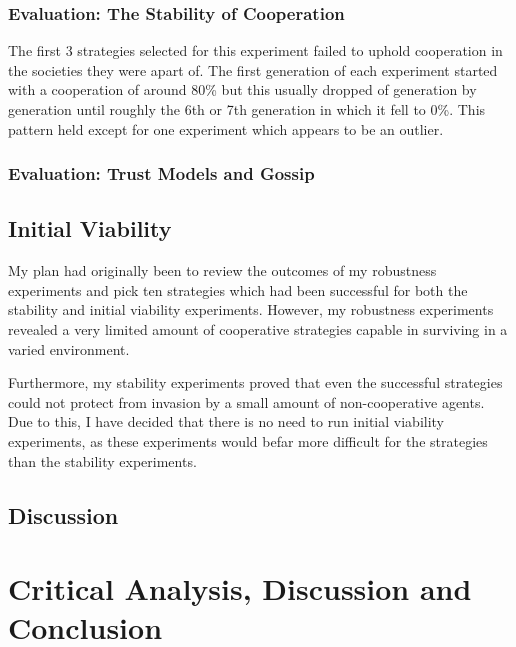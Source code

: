 \documentclass[]{final_report}
\begin{document}
\subsection{Evaluation: The Stability of Cooperation}
The first 3 strategies selected for this experiment failed to uphold cooperation in the societies they were apart of. The first generation of each experiment started with a cooperation of around 80\% but this usually dropped of generation by generation until roughly the 6th or 7th generation in which it fell to 0\%. This pattern held except for one experiment which appears to be an outlier.\par 


\subsection{Evaluation: Trust Models and Gossip}

\section{Initial Viability}
My plan had originally been to review the outcomes of my robustness experiments and pick ten strategies which had been successful for both the stability and initial viability experiments. However, my robustness experiments revealed a very limited amount of cooperative strategies capable in surviving in a varied environment.\par Furthermore, my stability experiments proved that even the successful strategies could not protect from invasion by a small amount of non-cooperative agents. Due to this, I have decided that there is no need to run initial viability experiments, as these experiments would befar more difficult for the strategies than the stability experiments.

\section{Discussion}

\chapter{Critical Analysis, Discussion and Conclusion}
\end{document}
